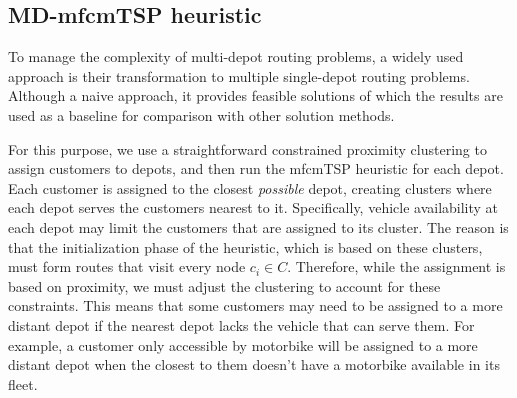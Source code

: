 \documentclass{article}
\begin{document}
	\subsection{MD-mfcmTSP heuristic}
	To manage the complexity of multi-depot routing problems, a widely used approach is their transformation to multiple single-depot routing problems. Although a naive approach, it provides feasible solutions of which the results are used as a baseline for comparison with other solution methods.
	\par 
	For this purpose, we use a straightforward constrained proximity clustering to assign customers to depots, and then run the mfcmTSP heuristic for each depot. Each customer is assigned to the closest \textit{possible} depot, creating clusters where each depot serves the customers nearest to it. Specifically, vehicle availability at each depot may limit the customers that are assigned to its cluster. The reason is that the initialization phase of the heuristic, which is based on these clusters, must form routes that visit every node $c_i\in C$. Therefore, while the assignment is based on proximity, we must adjust the clustering to account for these constraints. This means that some customers may need to be assigned to a more distant depot if the nearest depot lacks the vehicle that can serve them. For example, a customer only accessible by motorbike will be assigned to a more distant depot when the closest to them doesn't have a motorbike available in its fleet.
\end{document}
